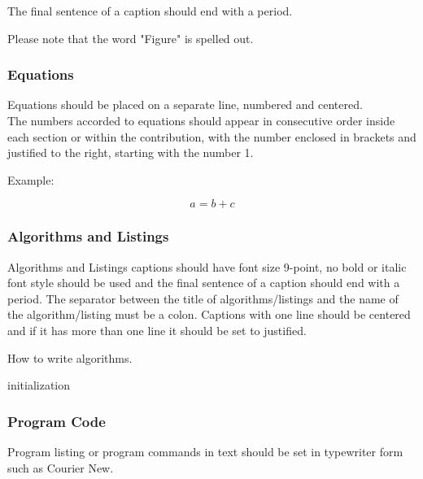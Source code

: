 \documentclass[a4paper,twoside]{article}
\begin{document}
The final sentence of a caption should end with a period.



Please note that the word "Figure" is spelled out.

\subsubsection{Equations}

Equations should be placed on a separate line, numbered and
centered.\\The numbers accorded to equations should appear in
consecutive order inside each section or within the contribution,
with the number enclosed in brackets and justified to the right,
starting with the number 1.

Example:

\begin{equation}\label{eq1}
    a=b+c
\end{equation}

\subsubsection{Algorithms and Listings}

Algorithms and Listings captions should have font size 9-point, no bold or
italic font style should be used and the final sentence of a caption should end with a period. The separator between the title of algorithms/listings and the name of the algorithm/listing must be a colon.
Captions with one line should be centered and if it has more than one line it should be set to justified.

\begin{algorithm}[!h]
 \caption{How to write algorithms.}
 initialization\;
\end{algorithm}


\bigskip
\subsubsection{Program Code}\label{subsubsec:program_code}

Program listing or program commands in text should be set in
typewriter form such as Courier New.
\end{document}
